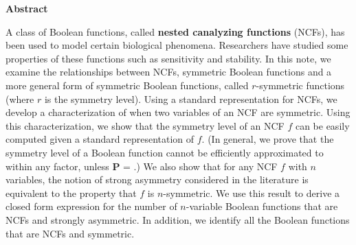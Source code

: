 \vspace*{-0.05in}
\begin{center}
\textbf{Abstract}  %
\end{center}

\smallskip

A class of Boolean functions, 
called \textbf{nested canalyzing functions} (NCFs),
has been used to model certain biological phenomena.
Researchers have studied some properties of these functions
such as sensitivity and stability.
In this note, we examine the relationships between NCFs, symmetric 
Boolean functions and a more general form of symmetric Boolean functions,
called $r$-symmetric functions (where $r$ is the symmetry level).
Using a standard representation for NCFs, we develop a 
characterization of when two variables of an NCF are symmetric.
Using this characterization, we show 
that the symmetry level of an NCF $f$
can be easily computed given a standard representation of $f$.
(In general, we prove that the symmetry level of
a Boolean function cannot be efficiently approximated
to within any factor, unless \textbf{P} = \cnp.)
We also show that for any NCF $f$ with $n$ variables, the notion of
strong asymmetry considered in the literature is equivalent to
the property that $f$ is $n$-symmetric. 
We use this result to derive a closed form expression for the
number of $n$-variable Boolean functions 
that are NCFs and strongly asymmetric.
In addition, we identify all the Boolean functions that are NCFs 
and symmetric. 
